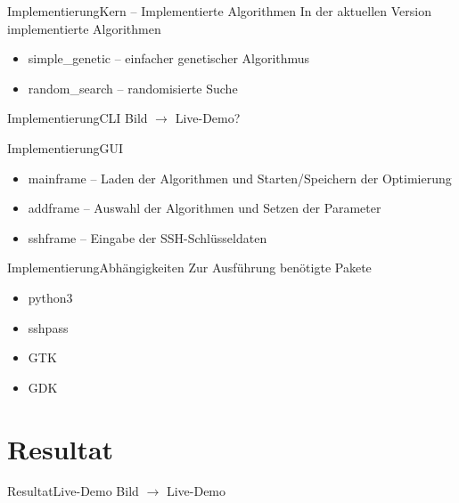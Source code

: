 \documentclass[ngerman,10pt,xcolor=colortbl,compress
]{beamer}
\begin{document}
	\begin{frame}{Implementierung}{Kern -- Implementierte Algorithmen}
	In der aktuellen Version implementierte Algorithmen
	\begin{itemize}
		\item simple\_genetic -- einfacher genetischer Algorithmus
		\item random\_search -- randomisierte Suche
	\end{itemize}
	\end{frame}
	
	\begin{frame}{Implementierung}{CLI}
	Bild $\rightarrow$ Live-Demo?
	\end{frame}

	\begin{frame}{Implementierung}{GUI}
	\begin{itemize}
		\item mainframe -- Laden der Algorithmen und Starten/Speichern der Optimierung
		\item addframe -- Auswahl der Algorithmen und Setzen der Parameter
		\item sshframe -- Eingabe der SSH-Schlüsseldaten
	\end{itemize}
	\end{frame}
	
	\begin{frame}{Implementierung}{Abhängigkeiten}
		Zur Ausführung benötigte Pakete
		\begin{itemize}
			\item python3
			\item sshpass
			\item GTK
			\item GDK
		\end{itemize}
	\end{frame}
	
	\section{Resultat}
	\begin{frame}{Resultat}{Live-Demo}
	Bild $\rightarrow$ Live-Demo
	\end{frame}

	
\end{document}
